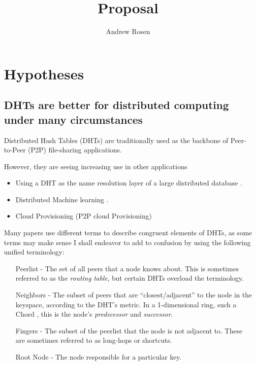 \documentclass[10pt,letterpaper]{report}
\title{Proposal}
\author{Andrew Rosen}
\begin{document}
\maketitle
\setcounter{tocdepth}{4}
\tableofcontents
\newpage
\chapter{Hypotheses}

\section{DHTs are better for distributed computing under many circumstances}
Distributed Hash Tables (DHTs) are traditionally used as the backbone of Peer-to-Peer (P2P) file-sharing applications.

However, they are seeing increasing use in other applications



\begin{itemize}
    \item Using a DHT as the name resolution layer of a large distributed database \cite{Mateescu2011440}. %
    \item Distributed Machine learning \cite{liparameter}.
    \item Cloud Provisioning  (P2P cloud Provisioning)
\end{itemize}


Many papers use different terms to describe congruent elements of DHTs, as some terms may make sense 
I shall endeavor to add to confusion by using the following unified terminology:
\begin{enumerate}
    \item[Peerlist] -  The set of all peers that a node knows about.  This is sometimes referred to as the \textit{routing table}, but certain DHTs \cite{tapestry} \cite{pastry} overload the terminology.
    \item[Neighbors] - The subset of peers that are ``closest/adjacent'' to the node in the keyspace, according to the DHT's metric.  In a 1-dimensional ring, such a Chord \cite{chord}, this is the node's \textit{predecessor} and \textit{successor}.
    \item[Fingers] - The subset of the peerlist that  the node is not adjacent to.  These are sometimes referred to as long-hops or shortcuts. 
    \item[Root Node] - The node responsible for a particular key. 
\end{enumerate}
\end{document}
